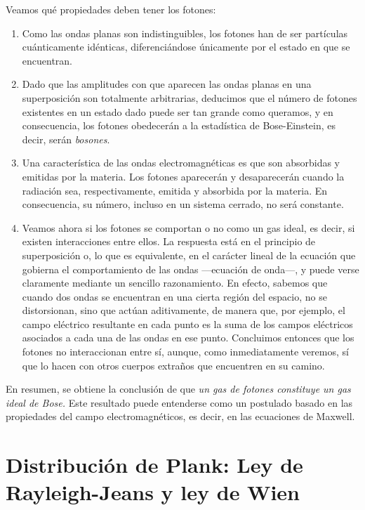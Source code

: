 Veamos qué propiedades deben tener los fotones:
\begin{enumerate}
	\item Como las ondas planas son indistinguibles, los fotones han de ser partículas cuánticamente idénticas, diferenciándose únicamente por el estado en que se encuentran.
	
	\item Dado que las amplitudes con que aparecen las ondas planas en una superposición son totalmente arbitrarias, deducimos que el número de fotones existentes en un estado dado puede ser tan grande como queramos, y en consecuencia, los fotones obedecerán a la estadística de Bose-Einstein, es decir, serán \emph{bosones}.
	
	\item Una característica de las ondas electromagnéticas es que son absorbidas y emitidas por la materia.
	Los fotones aparecerán y desaparecerán cuando la radiación sea, respectivamente, emitida y absorbida por la materia.
	En consecuencia, su número, incluso en un sistema cerrado, no será constante.
	
	\item Veamos ahora si los fotones se comportan o no como un gas ideal, es decir, si existen interacciones entre ellos.
	La respuesta está en el principio de superposición o, lo que es equivalente, en el carácter lineal de la ecuación que gobierna el comportamiento de las ondas ---ecuación de onda---, y puede verse claramente mediante un sencillo razonamiento.
	En efecto, sabemos que cuando dos ondas se encuentran en una cierta región del espacio, no se distorsionan, sino que actúan aditivamente, de manera que, por ejemplo, el campo eléctrico resultante en cada punto es la suma de los campos 	eléctricos asociados a cada una de las ondas en ese punto.
	Concluimos entonces que los fotones no interaccionan entre sí, aunque, como inmediatamente veremos, sí que lo hacen con otros cuerpos extraños que encuentren en su camino.
\end{enumerate}

En resumen, se obtiene la conclusión de que \emph{un gas de fotones constituye un gas ideal de Bose.}
Este resultado puede entenderse como un postulado basado en las propiedades del campo electromagnéticos, es decir, en las ecuaciones de Maxwell.

\section{Distribución de Plank: Ley de Rayleigh-Jeans y ley de Wien}

